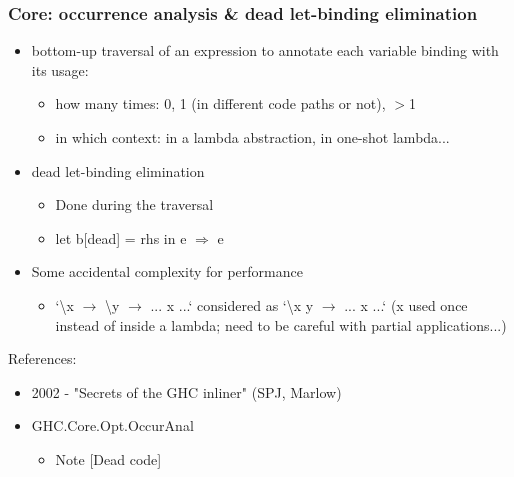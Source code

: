 \documentclass[aspectratio=169]{beamer}
\begin{document}
\begin{frame}
  \frametitle{Core: occurrence analysis \& dead let-binding elimination}

  \begin{itemize}
    \item bottom-up traversal of an expression to annotate each variable binding
      with its usage:
      \begin{itemize}
        \item how many times: 0, 1 (in different code paths or not), $>$1
        \item in which context: in a lambda abstraction, in one-shot lambda...
      \end{itemize}
    \item dead let-binding elimination
      \begin{itemize}
        \item Done during the traversal
        \item let b[dead] = rhs in e $\Longrightarrow$ e
      \end{itemize}
    \item Some accidental complexity for performance
      \begin{itemize}
        \item `\textbackslash x $\rightarrow$ \textbackslash y $\rightarrow$
          ... x ...` considered as `\textbackslash x y $\rightarrow$ ... x
          ...` (x used once instead of inside a lambda; need to be careful with
          partial applications...)
      \end{itemize}
  \end{itemize}

  References:
  \begin{itemize}
    \item 2002 - "Secrets of the GHC inliner" (SPJ, Marlow)
    \item GHC.Core.Opt.OccurAnal
      \begin{itemize}
        \item Note [Dead code]
      \end{itemize}
  \end{itemize}

\end{frame}
\end{document}
